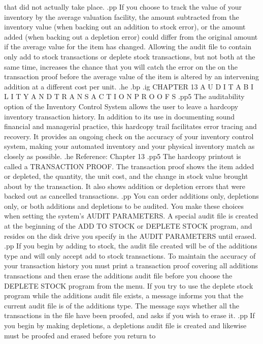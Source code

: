 that did not actually take place.
.pp
If you choose to track the value of your inventory by the average
valuation facility, the amount subtracted from the inventory value (when
backing out an addition to stock error), or the amount added (when backing
out a depletion error) could differ from the original amount if the average
value for the item has changed.  Allowing the audit file to contain only
add to stock transactions or deplete stock transactions, but not both
at the same time, increases the chance that you will catch the error on the
on the transaction proof
before the average value of the item is altered by an intervening addition
at a different cost per unit.
.he
.bp
.ig
CHAPTER 13
A U D I T A B I L I T Y    A N D   T R A N S A C T I O N
P R O O F S
.pp5
The auditability option of the Inventory Control System allows the user to
leave a hardcopy inventory transaction history.  In addition to its use
in documenting sound financial and managerial practice, this hardcopy trail
facilitates error tracing and recovery.  It provides an ongoing check on
the accuracy of your inventory control system, making your automated
inventory and your physical inventory match as closely as possible.
.he Reference: Chapter 13
.pp5
The hardcopy printout is called a TRANSACTION PROOF.  The transaction proof
shows the item added or depleted, the quantity, the unit cost, and the
change in stock value brought about by the transaction.  It also shows
addition or depletion errors that were backed out as cancelled transactions.
.pp
You can order additions only, depletions only, or both additions and
depletions to be audited.  You make these choices when setting the
system's AUDIT PARAMETERS. A special audit file is created at the beginning
of the ADD TO STOCK or DEPLETE STOCK program, and resides
on the disk drive you specify in the AUDIT PARAMETERS until erased.
.pp
If you begin by adding to stock, the audit file created will be of the
additions type and will only accept add to stock transactions.	To maintain
the accuracy of your transaction history you must
print a transaction proof covering all additions transactions and then
erase the additions audit file before you choose the DEPLETE STOCK
program from the menu.	If you try to use the deplete stock program
while the additions audit file exists, a message informs you that the
current audit file is of the additions type. The message says whether all the
transactions in the file have been proofed, and asks if you wish to erase it.
.pp
If you begin by making depletions, a depletions audit file is created
and likewise must be proofed and erased before you return to
